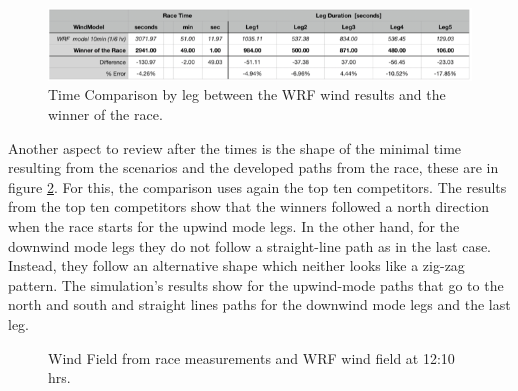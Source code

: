 \begin{figure}[hbt!] 
    \centering
    \includegraphics[width=0.95\linewidth]{images/table_comp_Wwinner.png}
    \caption{Time Comparison by leg between the WRF wind results and the winner of the race.}
    \label{fig:tableWinnerComp}
\end{figure}

Another aspect to review after the times is the shape of the minimal time resulting from the scenarios and the developed paths from the race, these are in figure \ref{fig:PathSimulations_topten}. For this, the comparison uses again the top ten competitors. The results from the top ten competitors show that the winners followed a north direction when the race starts for the upwind mode legs. In the other hand, for the downwind mode legs they do not follow a straight-line path as in the last case. Instead, they follow an alternative shape which neither looks like a zig-zag pattern. The simulation's results show for the upwind-mode paths that go to the north and south and straight lines paths for the downwind mode legs and the last leg.\par 
\begin{figure} [hbt!]
  \centering
  \hfill
  \hfill
  \caption{Wind Field from race measurements and WRF wind field at 12:10 hrs.}
\label{fig:PathSimulations_topten}
\end{figure}
